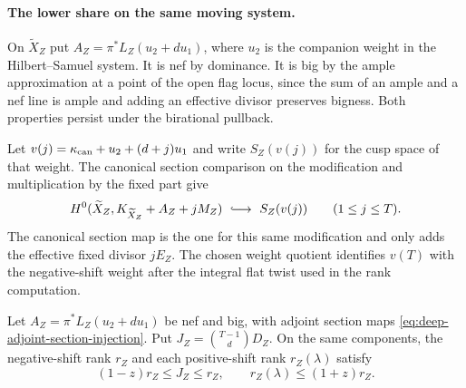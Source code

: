 \paragraph{The lower share on the same moving system.}
On \(\widetilde X_Z\) put
\(A_Z=\pi^*L_Z(u_2+d u_1)\), where \(u_2\) is the
companion weight in the Hilbert--Samuel system. It is
nef by dominance. It is big by the ample approximation
at a point of the open flag locus, since the sum of
an ample and a nef line is ample and adding an
effective divisor preserves bigness. Both properties
persist under the birational pullback.

Let \(v(j)=\kappa_{\rm can}+u_2+(d+j)u_1\) and write
\(S_Z(v(j))\) for the cusp space of that weight.
The canonical
section comparison on the modification and multiplication
by the fixed part give
\begin{equation}\label{eq:deep-adjoint-section-injection}
 H^0(\widetilde X_Z,K_{\widetilde X_Z}+A_Z+jM_Z)
 \ \lhook\joinrel\longrightarrow\ S_Z(v(j))
 \qquad(1\le j\le T).
\end{equation}
The canonical section map is the one for this same
modification and only adds the effective fixed divisor
\(jE_Z\). The chosen weight quotient identifies \(v(T)\)
with the negative-shift weight after the integral flat
twist used in the rank computation.

\begin{proposition}\label{prop:deep-moving-rank-lower}
Let \(A_Z=\pi^*L_Z(u_2+d u_1)\) be nef and big,
with adjoint section maps \eqref{eq:deep-adjoint-section-injection}.
Put \(J_Z=\binom{T-1}{d}D_Z\). On the same components,
the negative-shift rank \(r_Z\) and each positive-shift rank \(r_Z(\lambda)\) satisfy
\[
 (1-z)r_Z\le J_Z\le r_Z,\qquad r_Z(\lambda)\le(1+z)r_Z.
\]

\end{proposition}

